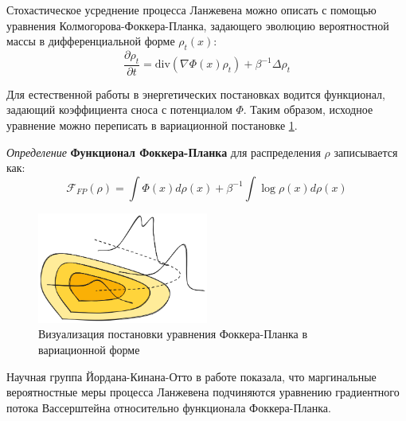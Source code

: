 Стохастическое усреднение процесса Ланжевена можно описать с помощью уравнения Колмогорова-Фоккера-Планка, 
задающего эволюцию вероятностной массы в дифференциальной форме  $\rho_t(x)$:
\begin{equation}
    \frac{\partial \rho_t}{\partial t} = \text{div}(\nabla \Phi(x) \rho_t) + \beta^{-1} \Delta \rho_t
\end{equation}

Для естественной работы в энергетических постановках водится функционал, задающий коэффициента сноса с потенциалом $\Phi$.
Таким образом, исходное уравнение можно переписать в вариационной постановке \ref{variation_fp}.

\textit{Определение} \textbf{Функционал Фоккера-Планка} для распределения $\rho$ записывается как: 
\begin{equation}
    \mathcal{F}_{FP}(\rho) = \int  \Phi(x) d\rho(x) + \beta^{-1} \int \log \rho(x) d \rho(x)
\end{equation}
\begin{figure}[h]
    \centering
    \includegraphics[width=0.5\textwidth]{assets/math/transport/functional.excalidraw.png}
    \caption{Визуализация постановки уравнения Фоккера-Планка в вариационной форме}
    \label{variation_fp}
\end{figure}
Научная группа Йордана-Кинана-Отто в работе \cite{jordan1998variational} показала, что маргинальные вероятностные
меры процесса Ланжевена подчиняются уравнению градиентного потока Вассерштейна относительно функционала Фоккера-Планка.

